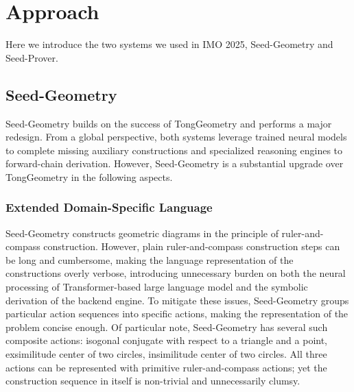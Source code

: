 \section{Approach}
Here we introduce the two systems we used in IMO 2025, Seed-Geometry and Seed-Prover.

\subsection{Seed-Geometry}
Seed-Geometry builds on the success of TongGeometry \cite{zhang2024proposing} and performs a major redesign. From a global perspective, both systems leverage trained neural models to complete missing auxiliary constructions and specialized reasoning engines to forward-chain derivation. However, Seed-Geometry is a substantial upgrade over TongGeometry in the following aspects.

\subsubsection{Extended Domain-Specific Language} 
Seed-Geometry constructs geometric diagrams in the principle of ruler-and-compass construction. However, plain ruler-and-compass construction steps can be long and cumbersome, making the language representation of the constructions overly verbose, introducing unnecessary burden on both the neural processing of Transformer-based large language model and the symbolic derivation of the backend engine. To mitigate these issues, Seed-Geometry groups particular action sequences into specific actions, making the representation of the problem concise enough. Of particular note, Seed-Geometry has several such composite actions: isogonal conjugate with respect to a triangle and a point, exsimilitude center of two circles, insimilitude center of two circles. All three actions can be represented with primitive ruler-and-compass actions; yet the construction sequence in itself is non-trivial and unnecessarily clumsy. 

